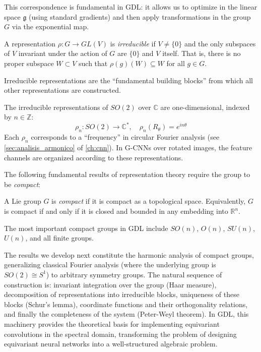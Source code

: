 This correspondence is fundamental in \gls{GDL}: it allows us to optimize in the linear space $\mathfrak{g}$ (using standard gradients) and then apply transformations in the group $G$ via the exponential map.

\begin{definition}\label{def:representacion_irreducible}
A representation $\rho: G \rightarrow GL(V)$ is \textit{irreducible} if $V \neq \{0\}$ and the only subspaces of $V$ invariant under the action of $G$ are $\{0\}$ and $V$ itself. That is, there is no proper subspace $W \subset V$ such that $\rho(g)(W) \subseteq W$ for all $g \in G$.
\end{definition}

Irreducible representations are the ``fundamental building blocks'' from which all other representations are constructed.

\begin{example}\label{ex:irreps_so2}
The irreducible representations of $SO(2)$ over $\mathbb{C}$ are one-dimensional, indexed by $n \in \mathbb{Z}$:
\begin{equation}
\rho_n: SO(2) \rightarrow \mathbb{C}^*, \quad \rho_n(R_\theta) = e^{in\theta}
\end{equation}
Each $\rho_n$ corresponds to a ``frequency'' in circular Fourier analysis (see \autoref{sec:analisis_armonico} of \autoref{ch:cnn}). In G-CNNs over rotated images, the feature channels are organized according to these representations.
\end{example}

The following fundamental results of representation theory require the group to be \textit{compact}:

\begin{definition}\label{def:grupo_compacto}
A Lie group $G$ is \textit{compact} if it is compact as a topological space. Equivalently, $G$ is compact if and only if it is closed and bounded in any embedding into $\mathbb{R}^n$.
\end{definition}

The most important compact groups in \gls{GDL} include $SO(n)$, $O(n)$, $SU(n)$, $U(n)$, and all finite groups.

The results we develop next constitute the harmonic analysis of compact groups, generalizing classical Fourier analysis (where the underlying group is $SO(2) \cong S^1$) to arbitrary symmetry groups. The natural sequence of construction is: invariant integration over the group (Haar measure), decomposition of representations into irreducible blocks, uniqueness of these blocks (Schur's lemma), coordinate functions and their orthogonality relations, and finally the completeness of the system (Peter-Weyl theorem). In \gls{GDL}, this machinery provides the theoretical basis for implementing equivariant convolutions in the spectral domain, transforming the problem of designing equivariant neural networks into a well-structured algebraic problem.

